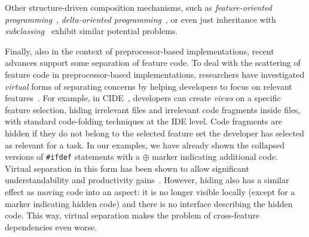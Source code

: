 Other structure-driven composition mechanisms, such as \emph{feature-oriented programming}~\cite{batory-refinement-tse04}, \emph{delta-oriented programming}~\cite{delta-ina-splc10}, or even just inheritance with \emph{subclassing}~\cite{fragile-base-class-ecoop98} exhibit similar potential problems.

Finally, also in the context of preprocessor-based implementations, recent advances support some separation of feature code.
To deal with the scattering of feature code in preprocessor-based implementations, researchers have investigated \emph{virtual} forms of separating concerns by helping developers to focus on relevant features~\cite{christian-cide-icse08,ABGM:TSE02,erwig-harmful,HKW:ICSE08}. For example, in CIDE~\cite{christian-cide-icse08}, developers can create \emph{views} on a specific feature selection, hiding irrelevant files and irrelevant code fragments inside files, with standard code-folding techniques at the IDE level. Code fragments are hidden if they do not belong to the selected feature set the developer has selected as relevant for a task. In our examples, we have already shown the collapsed versions of \texttt{\#ifdef} statements with a $\oplus$ marker indicating additional code. Virtual separation in this form has been shown to allow significant understandability and productivity gains~\cite{ABGM:TSE02,erwig-harmful}. However, hiding also has a similar effect as moving code into an aspect: it is no longer visible locally (except for a marker indicating hidden code) and there is no interface describing the hidden code. This way, virtual separation makes the problem of cross-feature dependencies even worse.





